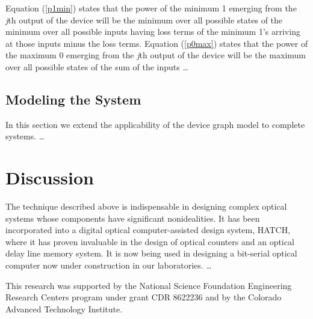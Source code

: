 Equation (\ref{p1min}) states that the power of
the minimum 1 emerging from the   {\it j}th output of the device will
be the minimum over all possible       states of the minimum over
all possible inputs having loss terms of       the minimum 1's
arriving at those inputs minus the loss terms.        Equation
(\ref{p0max}) states that the power of the       maximum 0 emerging
from the {\it j}th output of the device will be the  maximum over
all possible states of the sum of the inputs \ldots



\subsection{ Modeling the System}
In this section we extend the applicability of the device  graph model
to complete systems. \ldots

\section{Discussion}
The technique described above is indispensable in designing
complex optical systems whose components have significant
nonidealities.  It has been incorporated into a digital optical
computer-assisted design    system,  HATCH,\cite{10} where it has
proven invaluable in the design of optical  counters
and an optical delay line memory system.  It is now being
used in designing a bit-serial optical computer now       under
construction in our laboratories. \ldots


\acknowledgments
This research was supported by the National Science Foundation
Engineering Research Centers      program  under  grant   CDR
8622236 and by  the Colorado       Advanced Technology Institute.

